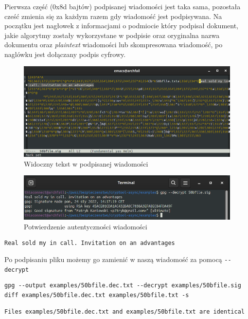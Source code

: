 \documentclass[11pt]{article}
\begin{document}
Pierwsza część (0x8d bajtów) podpisanej wiadomości jest taka sama, pozostała cześć zmienia się za każdym razem gdy wiadomość jest podpisywana. Na początku jest nagłowek z informacjami o podmiocie który podpisał dokument, jakie algorytmy zostały wykorzystane w podpisie oraz oryginalna nazwa dokumentu oraz \emph{plaintext} wiadomości lub skompresowana wiadomość, po naglówku jest dołączany podpis cyfrowy.
\begin{figure}[htbp]
\centering
\includegraphics[width=.9\linewidth]{./data/plaintext.png}
\caption{Widoczny tekst w podpisanej wiadomości}
\end{figure}

\begin{figure}[htbp]
\centering
\includegraphics[width=.9\linewidth]{./data/podpis.png}
\caption{Potwierdzenie autentyczności wiadomości}
\end{figure}

\begin{verbatim}
Real sold my in call. Invitation on an advantages
\end{verbatim}


Po podpisaniu pliku możemy go zamienić w naszą wiadomość za pomocą \texttt{-{}-decrypt}

\begin{verbatim}
gpg --output examples/50bfile.dec.txt --decrypt examples/50bfile.sig
diff examples/50bfile.dec.txt examples/50bfile.txt -s
\end{verbatim}

\begin{verbatim}
Files examples/50bfile.dec.txt and examples/50bfile.txt are identical
\end{verbatim}
\end{document}
